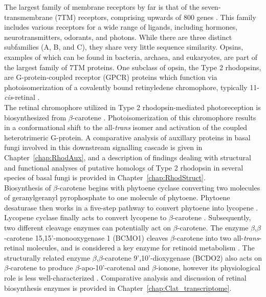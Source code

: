 \indent The largest family of membrane receptors by far is that of the seven-transmembrane (7TM) receptors, comprising upwards of 800 genes \cite{Pierce2002}. This family includes various receptors for a wide range of ligands, including hormones, neurotransmitters, odorants, and photons. While there are three distinct subfamilies (A, B, and C), they share very little sequence similarity. Opsins, examples of which can be found in bacteria, archaea, and eukaryotes, are part of the largest family of 7TM proteins. One subclass of opsin, the Type 2 rhodopsins, are G-protein-coupled receptor (GPCR) proteins which function via photoisomerization of a covalently bound retinyledene chromophore, typically 11-\textit{cis}-retinal \cite{Wald1968}.\\
\indent The retinal chromophore utilized in Type 2 rhodopsin-mediated photoreception is biosynthesized from $\beta$-carotene \cite{VonLintig2000}. Photoisomerization of this chromophore results in a conformational shift to the all-\textit{trans} isomer \cite{Smith2010} and activation of the coupled heterotrimeric G-protein. A comparative analysis of auxillary proteins in basal fungi involved in this downstream signalling cascade is given in Chapter~\ref{chap:RhodAux}, and a description of findings dealing with structural and functional analyses of putative homologs of Type 2 rhodopsin in several species of basal fungi is provided in Chapter~\ref{chap:RhodStruct}.\\
\indent Biosynthesis of $\beta$-carotene begins with phytoene cyclase converting two molecules of geranylgeranyl pyrophosphate to one molecule of phytoene. Phytoene desaturase then works in a five-step pathway to convert phytoene into lycopene \cite{Hausmann2000}. Lycopene cyclase finally acts to convert lycopene to $\beta$-carotene \cite{Cunningham1994}. Subsequently, two different cleavage enzymes can potentially act on $\beta$-carotene. The enzyme $\beta$,$\beta$-carotene 15,15'-monooxygenase 1 (BCMO1) cleaves $\beta$-carotene into two all-\textit{trans}-retinal molecules, and is considered a key enzyme for retinoid metabolism \cite{Lietz2012}. The structurally related enzyme $\beta$,$\beta$-carotene 9',10'-dioxygenase (BCDO2) also acts on $\beta$-carotene to produce $\beta$-apo-10'-carotenal and $\beta$-ionone, however its physiological role is less well-characterized \cite{Lobo2012}. Comparative analysis and discussion of retinal biosynthesis enzymes is provided in Chapter~\ref{chap:Clat_transcriptome}.\\
